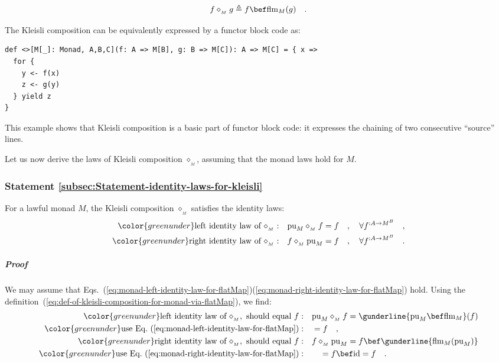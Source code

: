 ~\vspace{-0.8\baselineskip}
\begin{equation}
f\diamond_{_{M}}g\triangleq f\bef\text{flm}_{M}(g)\quad.\label{eq:def-of-kleisli-composition-for-monad-via-flatMap}
\end{equation}
\vspace{-0.5\baselineskip}

The Kleisli composition can be equivalently expressed by a functor
block code as:

\begin{lstlisting}[mathescape=true]
def <>[M[_]: Monad, A,B,C](f: A => M[B], g: B => M[C]): A => M[C] = { x =>
  for {
    y <- f(x)
    z <- g(y)
  } yield z
}
\end{lstlisting}

This example shows that Kleisli composition is a basic part of functor
block code: it expresses the chaining of two consecutive \textsf{``}source\textsf{''}
lines.

Let us now derive the laws of Kleisli composition $\diamond_{_{M}}$,
assuming that the monad laws hold for $M$. 

\subsubsection{Statement \label{subsec:Statement-identity-laws-for-kleisli}\ref{subsec:Statement-identity-laws-for-kleisli}}

For a lawful monad $M$, the Kleisli composition $\diamond_{_{M}}$
satisfies the identity laws:
\begin{align}
{\color{greenunder}\text{left identity law of }\diamond_{_{M}}:}\quad & \text{pu}_{M}\diamond_{_{M}}f=f\quad,\quad\forall f^{:A\rightarrow M^{B}}\quad,\label{eq:kleisli-left-identity-law}\\
{\color{greenunder}\text{right identity law of }\diamond_{_{M}}:}\quad & f\diamond_{_{M}}\text{pu}_{M}=f\quad,\quad\forall f^{:A\rightarrow M^{B}}\quad.\label{eq:kleisli-right-identity-law}
\end{align}


\subparagraph{Proof}

We may assume that Eqs.~(\ref{eq:monad-left-identity-law-for-flatMap})\textendash (\ref{eq:monad-right-identity-law-for-flatMap})
hold. Using the definition~(\ref{eq:def-of-kleisli-composition-for-monad-via-flatMap}),
we find:
\begin{align*}
{\color{greenunder}\text{left identity law of }\diamond_{_{M}},\text{ should equal }f:}\quad & \text{pu}_{M}\diamond_{_{M}}f=\gunderline{\text{pu}_{M}\bef\text{flm}_{M}}(f)\\
{\color{greenunder}\text{use Eq.~(\ref{eq:monad-left-identity-law-for-flatMap})}:}\quad & =f\quad,\\
{\color{greenunder}\text{right identity law of }\diamond_{_{M}},\text{ should equal }f:}\quad & f\diamond_{_{M}}\text{pu}_{M}=f\bef\gunderline{\text{flm}_{M}(\text{pu}_{M})}\\
{\color{greenunder}\text{use Eq.~(\ref{eq:monad-right-identity-law-for-flatMap})}:}\quad & \quad=f\bef\text{id}=f\quad.
\end{align*}

